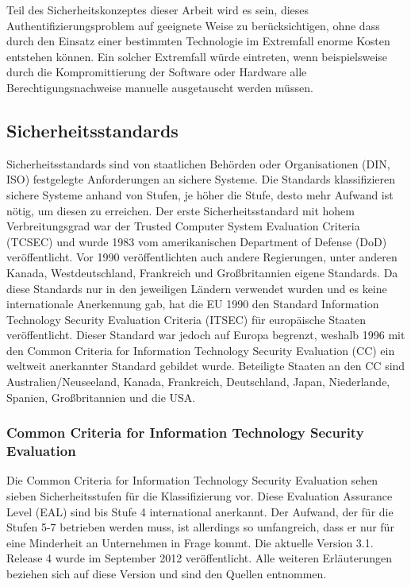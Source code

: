 \documentclass[11pt,a4paper]{report}
\begin{document}
Teil des Sicherheitskonzeptes dieser Arbeit wird es sein, dieses Authentifizierungsproblem auf geeignete Weise zu berücksichtigen, ohne dass durch den Einsatz einer bestimmten Technologie im Extremfall enorme Kosten entstehen können. Ein solcher Extremfall würde eintreten, wenn beispielsweise durch die Kompromittierung der Software oder Hardware alle Berechtigungsnachweise manuelle ausgetauscht werden müssen.

\subsection{Sicherheitsstandards} \label{sec:sec_standard}

Sicherheitsstandards sind von staatlichen Behörden oder Organisationen (DIN, ISO) festgelegte Anforderungen an sichere Systeme. Die Standards klassifizieren sichere Systeme anhand von Stufen, je höher die Stufe, desto mehr Aufwand ist nötig, um diesen zu erreichen. Der erste Sicherheitsstandard mit hohem Verbreitungsgrad war der Trusted Computer System Evaluation Criteria (TCSEC) und wurde 1983 vom amerikanischen Department of Defense (DoD) veröffentlicht. Vor 1990 veröffentlichten auch andere Regierungen, unter anderen Kanada, Westdeutschland, Frankreich und Großbritannien eigene Standards. Da diese Standards nur in den jeweiligen Ländern verwendet wurden und es keine internationale Anerkennung gab, hat die EU 1990 den Standard Information Technology Security Evaluation Criteria (ITSEC) für europäische Staaten veröffentlicht. Dieser Standard war jedoch auf Europa begrenzt, weshalb 1996 mit den Common Criteria for Information Technology Security Evaluation (CC) ein weltweit anerkannter Standard gebildet wurde. Beteiligte Staaten an den CC sind Australien/Neuseeland, Kanada, Frankreich, Deutschland, Japan, Niederlande, Spanien, Großbritannien und die USA.

\subsubsection{Common Criteria for Information Technology Security Evaluation}

Die Common Criteria for Information Technology Security Evaluation sehen sieben Sicherheitsstufen für die Klassifizierung vor. Diese Evaluation Assurance Level (EAL) sind bis Stufe 4 international anerkannt. Der Aufwand, der für die Stufen 5-7 betrieben werden muss, ist allerdings so umfangreich, dass er nur für eine Minderheit an Unternehmen in Frage kommt. Die aktuelle Version 3.1. Release 4 wurde im September 2012 veröffentlicht. Alle weiteren Erläuterungen beziehen sich auf diese Version und sind den Quellen \cite{ccp1, ccp2, ccp3, bsi_ccguide} entnommen.
\end{document}

